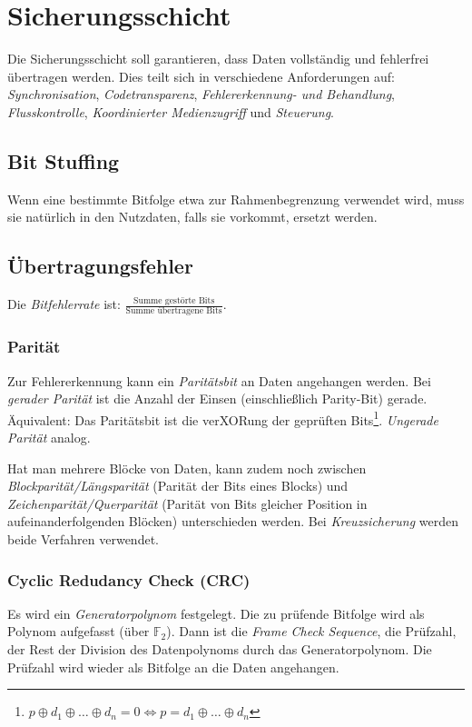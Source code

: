 \documentclass[a4paper,parskip=half*,DIV=15,fontsize=11pt]{scrartcl}
\begin{document}
\section{Sicherungsschicht}

Die Sicherungsschicht soll garantieren, dass Daten vollständig und fehlerfrei übertragen werden. Dies teilt sich in verschiedene Anforderungen auf: \emph{Synchronisation}, \emph{Codetransparenz}, \emph{Fehlererkennung- und Behandlung}, \emph{Flusskontrolle}, \emph{Koordinierter Medienzugriff} und \emph{Steuerung}.

\subsection{Bit Stuffing}

Wenn eine bestimmte Bitfolge etwa zur Rahmenbegrenzung verwendet wird, muss sie natürlich in den Nutzdaten, falls sie vorkommt, ersetzt werden.

\subsection{Übertragungsfehler}

Die \emph{Bitfehlerrate} ist: $\frac{\textrm{Summe gestörte Bits}}{\textrm{Summe übertragene Bits}}$.

\subsubsection{Parität}

Zur Fehlererkennung kann ein \emph{Paritätsbit} an Daten angehangen werden. Bei \emph{gerader Parität} ist die Anzahl der Einsen (einschließlich Parity-Bit) gerade. Äquivalent: Das Paritätsbit ist die verXORung der geprüften Bits\footnote{$p \oplus d_1 \oplus \ldots \oplus d_n = 0 \iff p = d_1 \oplus \ldots \oplus d_n$}. \emph{Ungerade Parität} analog.

Hat man mehrere Blöcke von Daten, kann zudem noch zwischen \emph{Blockparität/Längsparität} (Parität der Bits eines Blocks) und \emph{Zeichenparität/Querparität} (Parität von Bits gleicher Position in aufeinanderfolgenden Blöcken) unterschieden werden. Bei \emph{Kreuzsicherung} werden beide Verfahren verwendet.

\subsubsection{Cyclic Redudancy Check (CRC)}

Es wird ein \emph{Generatorpolynom} festgelegt. Die zu prüfende Bitfolge wird als Polynom aufgefasst (über $\mathbb{F}_2$). Dann ist die \emph{Frame Check Sequence}, die Prüfzahl, der Rest der Division des Datenpolynoms durch das Generatorpolynom. Die Prüfzahl wird wieder als Bitfolge an die Daten angehangen.
\end{document}

